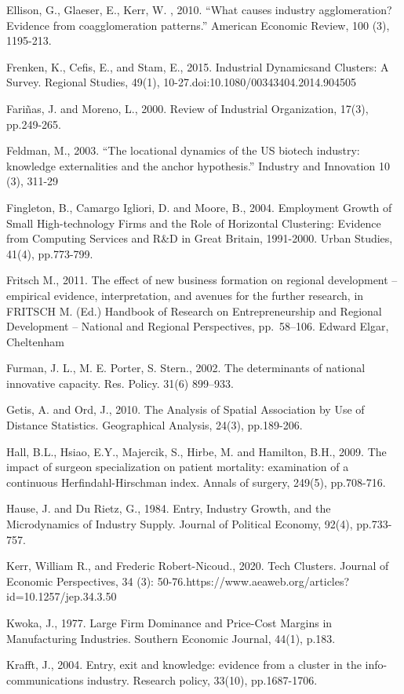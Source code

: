 \documentclass[
  12pt,
  oneside]{book}
\begin{document}
Ellison, G., Glaeser, E., Kerr, W. , 2010. ``What causes industry agglomeration? Evidence from
coagglomeration patterns.'' American Economic Review, 100 (3), 1195-213.

Frenken, K., Cefis, E., and Stam, E., 2015. Industrial Dynamicsand Clusters: A Survey. Regional Studies, 49(1), 10-27.doi:10.1080/00343404.2014.904505

Fariñas, J. and Moreno, L., 2000. Review of Industrial Organization, 17(3), pp.249-265.

Feldman, M., 2003. ``The locational dynamics of the US biotech industry: knowledge externalities
and the anchor hypothesis.'' Industry and Innovation 10 (3), 311-29

Fingleton, B., Camargo Igliori, D. and Moore, B., 2004. Employment Growth of Small High-technology Firms and the Role of Horizontal Clustering: Evidence from Computing Services and R\&D in Great Britain, 1991-2000. Urban Studies, 41(4), pp.773-799.

Fritsch M., 2011. The effect of new business formation on regional development -- empirical evidence, interpretation, and avenues for the further research, in FRITSCH M. (Ed.) Handbook of Research on Entrepreneurship and Regional Development -- National and Regional Perspectives, pp.~58--106. Edward Elgar, Cheltenham

Furman, J. L., M. E. Porter, S. Stern., 2002. The determinants of national innovative capacity. Res. Policy. 31(6) 899--933.

Getis, A. and Ord, J., 2010. The Analysis of Spatial Association by Use of Distance Statistics. Geographical Analysis, 24(3), pp.189-206.

Hall, B.L., Hsiao, E.Y., Majercik, S., Hirbe, M. and Hamilton, B.H., 2009. The impact of surgeon specialization on patient mortality: examination of a continuous Herfindahl-Hirschman index. Annals of surgery, 249(5), pp.708-716.

Hause, J. and Du Rietz, G., 1984. Entry, Industry Growth, and the Microdynamics of Industry Supply. Journal of Political Economy, 92(4), pp.733-757.

Kerr, William R., and Frederic Robert-Nicoud., 2020. Tech Clusters. Journal of Economic Perspectives, 34 (3): 50-76.https://www.aeaweb.org/articles?id=10.1257/jep.34.3.50

Kwoka, J., 1977. Large Firm Dominance and Price-Cost Margins in Manufacturing Industries. Southern Economic Journal, 44(1), p.183.

Krafft, J., 2004. Entry, exit and knowledge: evidence from a cluster in the info-communications industry. Research policy, 33(10), pp.1687-1706.
\end{document}
